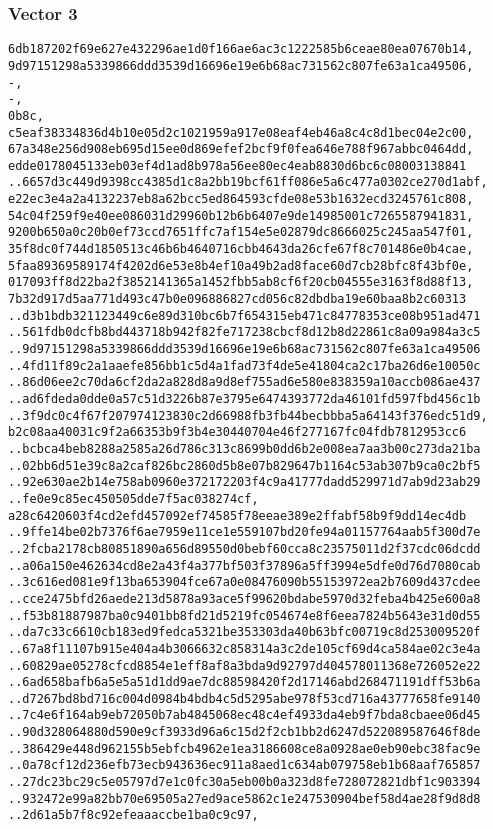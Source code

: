 \documentclass[
]{article}
\begin{document}
\subsubsection{Vector 3}\label{vector-3-2}

\begin{verbatim}
6db187202f69e627e432296ae1d0f166ae6ac3c1222585b6ceae80ea07670b14,
9d97151298a5339866ddd3539d16696e19e6b68ac731562c807fe63a1ca49506,
-,
-,
0b8c,
c5eaf38334836d4b10e05d2c1021959a917e08eaf4eb46a8c4c8d1bec04e2c00,
67a348e256d908eb695d15ee0d869efef2bcf9f0fea646e788f967abbc0464dd,
edde0178045133eb03ef4d1ad8b978a56ee80ec4eab8830d6bc6c08003138841
..6657d3c449d9398cc4385d1c8a2bb19bcf61ff086e5a6c477a0302ce270d1abf,
e22ec3e4a2a4132237eb8a62bcc5ed864593cfde08e53b1632ecd3245761c808,
54c04f259f9e40ee086031d29960b12b6b6407e9de14985001c7265587941831,
9200b650a0c20b0ef73ccd7651ffc7af154e5e02879dc8666025c245aa547f01,
35f8dc0f744d1850513c46b6b4640716cbb4643da26cfe67f8c701486e0b4cae,
5faa89369589174f4202d6e53e8b4ef10a49b2ad8face60d7cb28bfc8f43bf0e,
017093ff8d22ba2f3852141365a1452fbb5ab8cf6f20cb04555e3163f8d88f13,
7b32d917d5aa771d493c47b0e096886827cd056c82dbdba19e60baa8b2c60313
..d3b1bdb321123449c6e89d310bc6b7f654315eb471c84778353ce08b951ad471
..561fdb0dcfb8bd443718b942f82fe717238cbcf8d12b8d22861c8a09a984a3c5
..9d97151298a5339866ddd3539d16696e19e6b68ac731562c807fe63a1ca49506
..4fd11f89c2a1aaefe856bb1c5d4a1fad73f4de5e41804ca2c17ba26d6e10050c
..86d06ee2c70da6cf2da2a828d8a9d8ef755ad6e580e838359a10accb086ae437
..ad6fdeda0dde0a57c51d3226b87e3795e6474393772da46101fd597fbd456c1b
..3f9dc0c4f67f207974123830c2d66988fb3fb44becbbba5a64143f376edc51d9,
b2c08aa40031c9f2a66353b9f3b4e30440704e46f277167fc04fdb7812953cc6
..bcbca4beb8288a2585a26d786c313c8699b0dd6b2e008ea7aa3b00c273da21ba
..02bb6d51e39c8a2caf826bc2860d5b8e07b829647b1164c53ab307b9ca0c2bf5
..92e630ae2b14e758ab0960e372172203f4c9a41777dadd529971d7ab9d23ab29
..fe0e9c85ec450505dde7f5ac038274cf,
a28c6420603f4cd2efd457092ef74585f78eeae389e2ffabf58b9f9dd14ec4db
..9ffe14be02b7376f6ae7959e11ce1e559107bd20fe94a01157764aab5f300d7e
..2fcba2178cb80851890a656d89550d0bebf60cca8c23575011d2f37cdc06dcdd
..a06a150e462634cd8e2a43f4a377bf503f37896a5ff3994e5dfe0d76d7080cab
..3c616ed081e9f13ba653904fce67a0e08476090b55153972ea2b7609d437cdee
..cce2475bfd26aede213d5878a93ace5f99620bdabe5970d32feba4b425e600a8
..f53b81887987ba0c9401bb8fd21d5219fc054674e8f6eea7824b5643e31d0d55
..da7c33c6610cb183ed9fedca5321be353303da40b63bfc00719c8d253009520f
..67a8f11107b915e404a4b3066632c858314a3c2de105cf69d4ca584ae02c3e4a
..60829ae05278cfcd8854e1eff8af8a3bda9d92797d404578011368e726052e22
..6ad658bafb6a5e5a51d1dd9ae7dc88598420f2d17146abd268471191dff53b6a
..d7267bd8bd716c004d0984b4bdb4c5d5295abe978f53cd716a43777658fe9140
..7c4e6f164ab9eb72050b7ab4845068ec48c4ef4933da4eb9f7bda8cbaee06d45
..90d328064880d590e9cf3933d96a6c15d2f2cb1bb2d6247d522089587646f8de
..386429e448d962155b5ebfcb4962e1ea3186608ce8a0928ae0eb90ebc38fac9e
..0a78cf12d236efb73ecb943636ec911a8aed1c634ab079758eb1b68aaf765857
..27dc23bc29c5e05797d7e1c0fc30a5eb00b0a323d8fe728072821dbf1c903394
..932472e99a82bb70e69505a27ed9ace5862c1e247530904bef58d4ae28f9d8d8
..2d61a5b7f8c92efeaaaccbe1ba0c9c97,
\end{verbatim}
\end{document}
